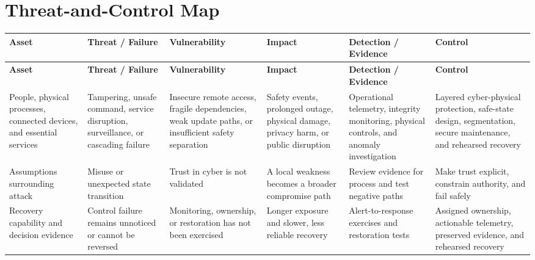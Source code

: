 \documentclass[11pt]{article}
\begin{document}
\section*{Threat-and-Control Map}
\begingroup\scriptsize\setlength{\tabcolsep}{2pt}
\begin{longtable}{>{\RaggedRight\arraybackslash}p{}>{\RaggedRight\arraybackslash}p{}>{\RaggedRight\arraybackslash}p{}>{\RaggedRight\arraybackslash}p{}>{\RaggedRight\arraybackslash}p{}>{\RaggedRight\arraybackslash}p{}}
\toprule\rowcolor{Navy}\color{white}\textbf{Asset} & \color{white}\textbf{Threat / Failure} & \color{white}\textbf{Vulnerability} & \color{white}\textbf{Impact} & \color{white}\textbf{Detection / Evidence} & \color{white}\textbf{Control}\\\midrule
\endfirsthead
\toprule\rowcolor{Navy}\color{white}\textbf{Asset} & \color{white}\textbf{Threat / Failure} & \color{white}\textbf{Vulnerability} & \color{white}\textbf{Impact} & \color{white}\textbf{Detection / Evidence} & \color{white}\textbf{Control}\\\midrule
\endhead
People, physical processes, connected devices, and essential services & Tampering, unsafe command, service disruption, surveillance, or cascading failure & Insecure remote access, fragile dependencies, weak update paths, or insufficient safety separation & Safety events, prolonged outage, physical damage, privacy harm, or public disruption & Operational telemetry, integrity monitoring, physical controls, and anomaly investigation & Layered cyber-physical protection, safe-state design, segmentation, secure maintenance, and rehearsed recovery\\\midrule
Assumptions surrounding attack & Misuse or unexpected state transition & Trust in cyber is not validated & A local weakness becomes a broader compromise path & Review evidence for process and test negative paths & Make trust explicit, constrain authority, and fail safely\\\midrule
Recovery capability and decision evidence & Control failure remains unnoticed or cannot be reversed & Monitoring, ownership, or restoration has not been exercised & Longer exposure and slower, less reliable recovery & Alert-to-response exercises and restoration tests & Assigned ownership, actionable telemetry, preserved evidence, and rehearsed recovery\\\midrule
\bottomrule
\end{longtable}
\endgroup
\end{document}
